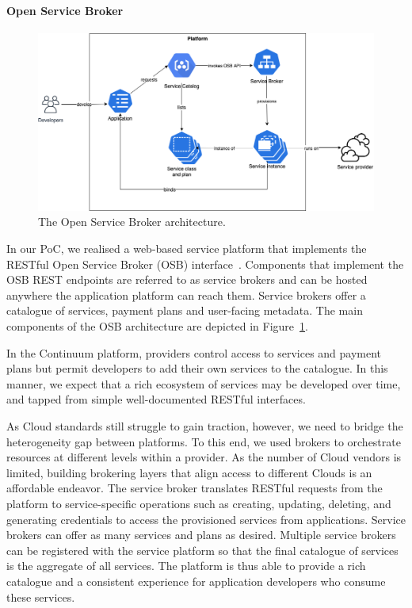 \paragraph{Open Service Broker}

\begin{figure}[ht]
\centering
\includegraphics[width=\columnwidth]{figures/osb}
\caption{The Open Service Broker architecture.} \label{fig:osb}
\end{figure}

In our PoC, we realised a web-based service platform that implements the RESTful Open Service Broker (OSB) interface~\cite{osb}. Components that implement the OSB REST endpoints are referred to as service brokers and can be hosted anywhere the application platform can reach them. Service brokers offer a catalogue of services, payment plans and user-facing metadata. The main components of the OSB architecture are depicted in Figure~\ref{fig:osb}.

In the Continuum platform, providers control access to services and payment plans but permit developers to add their own services to the catalogue. In this manner, we expect that a rich ecosystem of services may be developed over time, and tapped from simple well-documented RESTful interfaces.

As Cloud standards still struggle to gain traction, however, we need to bridge the heterogeneity gap between platforms. 
To this end, we used brokers to orchestrate resources at different levels within a provider. As the number of Cloud vendors is limited, building brokering layers that align access to different Clouds is an affordable endeavor. The service broker translates RESTful requests from the platform to service-specific operations such as creating, updating, deleting, and generating credentials to access the provisioned services from applications. Service brokers can offer as many services and plans as desired. Multiple service brokers can be registered with the service platform so that the final catalogue of services is the aggregate of all services. The platform is thus able to provide a rich catalogue and a consistent experience for application developers who consume these services.

